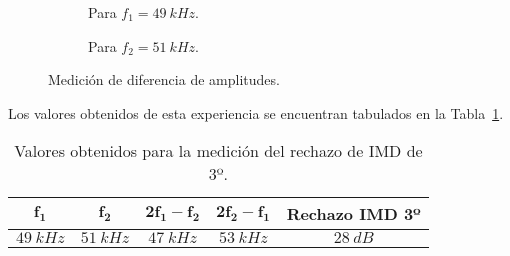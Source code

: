     \begin{figure}[H]
      \centering
      \begin{subfigure}[H]{0.48\textwidth}
        \caption{Para $f_1=49~kHz$.}
      \end{subfigure}
      \hfill 
      \begin{subfigure}[H]{0.48\textwidth}
        \caption{Para $f_2=51~kHz$.}
      \end{subfigure}

      \caption{Medición de diferencia de amplitudes.}
      \label{fig:MedicionIMD}
    \end{figure}

    Los valores obtenidos de esta experiencia se encuentran tabulados en la Tabla~\ref{tab:DatosDeMedicionDeIMD}.

    \begin{table}[H]
      \centering
    \begin{tabular}{ccccc} \hline \hline
      $\mathbf{f_{1}}$    &   $\mathbf{f_{2}}$  &  $\mathbf{2f_{1}-f_{2}}$  & $\mathbf{2f_{2}-f_1}$  & \textbf{Rechazo IMD 3º}\\ \hline
      $49~kHz$   &   $51~kHz$   &    $47~kHz$   &   $53~kHz$  & $28~dB$ \\ \hline \hline
      \end{tabular}
      \caption{Valores obtenidos para la medición del rechazo de IMD de 3º.}
      \label{tab:DatosDeMedicionDeIMD}
    \end{table}


    \pagebreak


